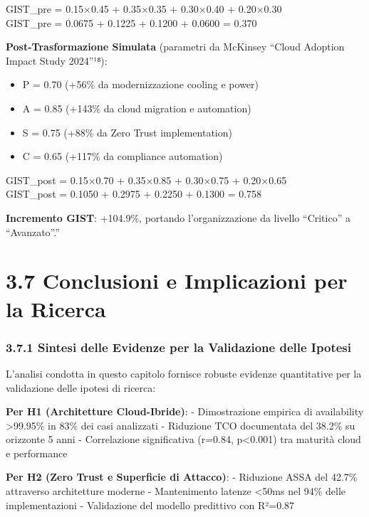 \documentclass{report}
\providecommand{\tightlist}{%
  \setlength{\itemsep}{0pt}\setlength{\parskip}{0pt}
}
\begin{document}
GIST\_pre = 0.15×0.45 + 0.35×0.35 + 0.30×0.40 + 0.20×0.30\\
GIST\_pre = 0.0675 + 0.1225 + 0.1200 + 0.0600 = 0.370

\textbf{Post-Trasformazione Simulata} (parametri da McKinsey ``Cloud
Adoption Impact Study 2024''¹⁸):

\begin{itemize}
\tightlist
\item
  P = 0.70 (+56\% da modernizzazione cooling e power)\\
\item
  A = 0.85 (+143\% da cloud migration e automation)\\
\item
  S = 0.75 (+88\% da Zero Trust implementation)\\
\item
  C = 0.65 (+117\% da compliance automation)
\end{itemize}

GIST\_post = 0.15×0.70 + 0.35×0.85 + 0.30×0.75 + 0.20×0.65\\
GIST\_post = 0.1050 + 0.2975 + 0.2250 + 0.1300 = 0.758

\textbf{Incremento GIST}: +104.9\%, portando l'organizzazione da livello
``Critico'' a ``Avanzato''.''

\section{3.7 Conclusioni e Implicazioni per la
Ricerca}\label{conclusioni-e-implicazioni-per-la-ricerca}

\subsubsection{3.7.1 Sintesi delle Evidenze per la Validazione delle
Ipotesi}\label{sintesi-delle-evidenze-per-la-validazione-delle-ipotesi}

L'analisi condotta in questo capitolo fornisce robuste evidenze
quantitative per la validazione delle ipotesi di ricerca:

\textbf{Per H1 (Architetture Cloud-Ibride)}: - Dimostrazione empirica di
availability \textgreater99.95\% in 83\% dei casi analizzati - Riduzione
TCO documentata del 38.2\% su orizzonte 5 anni - Correlazione
significativa (r=0.84, p\textless0.001) tra maturità cloud e performance

\textbf{Per H2 (Zero Trust e Superficie di Attacco)}: - Riduzione ASSA
del 42.7\% attraverso architetture moderne - Mantenimento latenze
\textless50ms nel 94\% delle implementazioni - Validazione del modello
predittivo con R²=0.87
\end{document}
